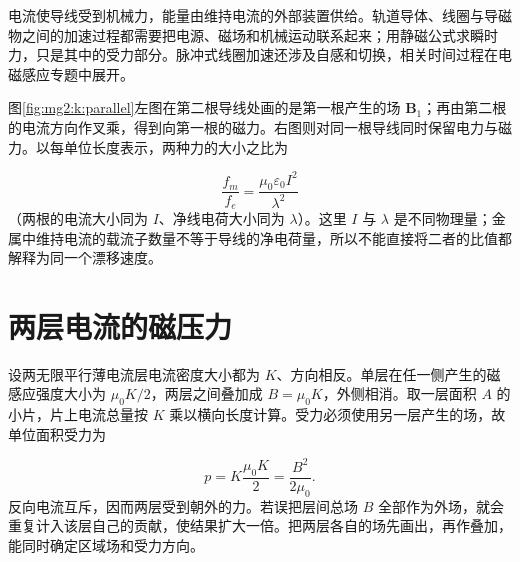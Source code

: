 电流使导线受到机械力，能量由维持电流的外部装置供给。轨道导体、线圈与导磁物之间的加速过程都需要把电源、磁场和机械运动联系起来；用静磁公式求瞬时力，只是其中的受力部分。脉冲式线圈加速还涉及自感和切换，相关时间过程在电磁感应专题中展开。

图\ref{fig:mg2:k:parallel}左图在第二根导线处画的是第一根产生的场 $\bm B_1$；再由第二根的电流方向作叉乘，得到向第一根的磁力。右图则对同一根导线同时保留电力与磁力。以每单位长度表示，两种力的大小之比为

\[
 \frac{f_m}{f_e}=\frac{\mu_0\varepsilon_0 I^2}{\lambda^2}
\]
（两根的电流大小同为 $I$、净线电荷大小同为 $\lambda$）。这里 $I$ 与 $\lambda$ 是不同物理量；金属中维持电流的载流子数量不等于导线的净电荷量，所以不能直接将二者的比值都解释为同一个漂移速度。



\section{两层电流的磁压力}
设两无限平行薄电流层电流密度大小都为 $K$、方向相反。单层在任一侧产生的磁感应强度大小为 $\mu_0K/2$，两层之间叠加成 $B=\mu_0K$，外侧相消。取一层面积 $A$ 的小片，片上电流总量按 $K$ 乘以横向长度计算。受力必须使用另一层产生的场，故单位面积受力为

\[
p=K\frac{\mu_0K}{2}=\frac{B^2}{2\mu_0}.
\]
反向电流互斥，因而两层受到朝外的力。若误把层间总场 $B$ 全部作为外场，就会重复计入该层自己的贡献，使结果扩大一倍。把两层各自的场先画出，再作叠加，能同时确定区域场和受力方向。


